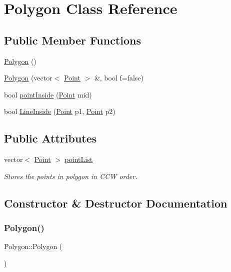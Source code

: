 \hypertarget{classPolygon}{}\section{Polygon Class Reference}
\label{classPolygon}
\subsection*{Public Member Functions}
\begin{DoxyCompactItemize}
\item 
\hyperlink{classPolygon_ac183e712f8be1e13f1c9d5b4d4512ead}{Polygon} ()
\item 
\hyperlink{classPolygon_a67e4b3859fad4adfcf277c79280df0df}{Polygon} (vector$<$ \hyperlink{classPoint}{Point} $>$ \&, bool f=false)
\item 
bool \hyperlink{classPolygon_a034496e14ddd5516b3aed14c61d6fe02}{point\+Inside} (\hyperlink{classPoint}{Point} mid)
\item 
bool \hyperlink{classPolygon_acfe38a0974806e9706618d81b52ce8b7}{Line\+Inside} (\hyperlink{classPoint}{Point} p1, \hyperlink{classPoint}{Point} p2)
\end{DoxyCompactItemize}
\subsection*{Public Attributes}
\begin{DoxyCompactItemize}
\item 
\mbox{\label{classPolygon_a97193505e5b790557c7e18ed4bd025c5}} 
vector$<$ \hyperlink{classPoint}{Point} $>$ \hyperlink{classPolygon_a97193505e5b790557c7e18ed4bd025c5}{point\+List}
\begin{DoxyCompactList}\small\item\em Stores the points in polygon in C\+CW order. \end{DoxyCompactList}\end{DoxyCompactItemize}


\subsection{Constructor \& Destructor Documentation}
\mbox{\label{classPolygon_ac183e712f8be1e13f1c9d5b4d4512ead}} 
\subsubsection{\texorpdfstring{Polygon()}{Polygon()}\hspace{0.1cm}{\footnotesize\ttfamily [1/2]}}
{\footnotesize\ttfamily Polygon\+::\+Polygon (\begin{DoxyParamCaption}{ }\end{DoxyParamCaption})}

